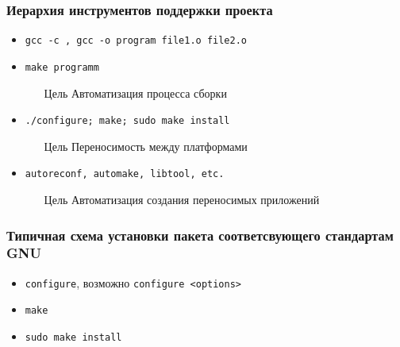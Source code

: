 \begin{frame}
 \frametitle{Иерархия инструментов поддержки проекта}
 \begin{itemize}
   \item \texttt{gcc -c , gcc -o program file1.o file2.o}
     \pause
   \item \texttt{make programm}
     \begin{enumerate}
       \item[Цель] Автоматизация процесса сборки
      \end{enumerate}
     \pause
   \item \texttt{./configure; make; sudo make install}
     \begin{enumerate}
       \item[Цель] Переносимость между платформами
      \end{enumerate}
     \pause
   \item \texttt{autoreconf, automake, libtool, etc.}
     \begin{enumerate}
       \item[Цель] Автоматизация создания переносимых приложений
      \end{enumerate}
 \end{itemize}
\end{frame}

\begin{frame}
  \frametitle{Типичная схема установки пакета соответсвующего стандартам GNU}
  \begin{itemize}
    \item \texttt{configure}, возможно \texttt{configure <options>}
    \item \texttt{make}
    \item \texttt{sudo make install} 
   \end{itemize}
\end{frame}


